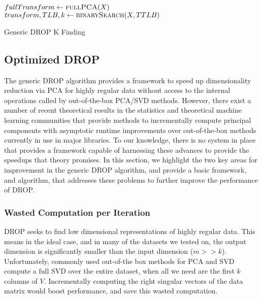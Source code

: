 \begin{algorithm}
\begin{algorithmic}
	\State $fullTransform \gets \textsc{fullPCA}(X)$
	\State 	$transform, TLB, k \gets \textsc{binarySearch}(X, TTLB)$

\EndFunction
\end{algorithmic}
\caption{Generic DROP K Finding}
\label{alg:generic}
\end{algorithm}


\subsection{Optimized DROP}

The generic DROP algorithm provides a framework to speed up dimensionality reduction via PCA for highly regular data without access to the internal operations called by out-of-the-box PCA/SVD methods. However, there exist a number of recent theoretical results in the statistics and theoretical machine learning communities that provide methods to incrementally compute principal components with asymptotic runtime improvements over out-of-the-box methods currently in use in major libraries. To our knowledge, there is no system in place that provides a framework capable of harnessing these advances to provide the speedups that theory promises. In this section, we highlight the two key areas for improvement in the generic DROP algorithm, and provide a basic framework, and algorithm, that addresses these problems to further improve the performance of DROP. 

\subsubsection{Wasted Computation per Iteration}
DROP seeks to find low dimensional representations of highly regular data. This means in the ideal case, and in many of the datasets we tested on, the output dimension is significantly smaller than the input dimension ($m >> k$). Unfortunately, commonly used out-of-the box methods for PCA and SVD compute a full SVD over the entire dataset, when all we need are the first $k$ columns of $V$. Incrementally computing the right singular vectors of the data matrix would boost performance, and save this wasted computation. 

